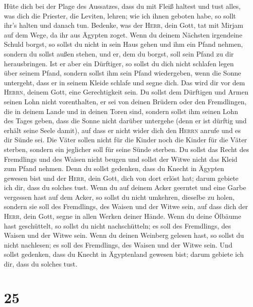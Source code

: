  Hüte dich bei der Plage des Aussatzes, dass du mit Fleiß
haltest und tust alles, was dich die Priester, die Leviten, lehren; wie
ich ihnen geboten habe, so sollt ihr's halten und danach tun.
 Bedenke, was der \textsc{Herr}, dein Gott, tat mit Mirjam
auf dem Wege, da ihr aus Ägypten zoget.  Wenn du deinem
Nächsten irgendeine Schuld borgst, so sollst du nicht in sein Haus gehen
und ihm ein Pfand nehmen,  sondern du sollst außen
stehen, und er, dem du borgst, soll sein Pfand zu dir herausbringen.
 Ist er aber ein Dürftiger, so sollst du dich nicht
schlafen legen über seinem Pfand,  sondern sollst ihm
sein Pfand wiedergeben, wenn die Sonne untergeht, dass er in seinem
Kleide schlafe und segne dich. Das wird dir vor dem \textsc{Herrn},
deinem Gott, eine Gerechtigkeit sein.  Du sollst dem
Dürftigen und Armen seinen Lohn nicht vorenthalten, er sei von deinen
Brüdern oder den Fremdlingen, die in deinem Lande und in deinen Toren
sind,  sondern sollst ihm seinen Lohn des Tages geben,
dass die Sonne nicht darüber untergehe (denn er ist dürftig und erhält
seine Seele damit), auf dass er nicht wider dich den \textsc{Herrn}
anrufe und es dir Sünde sei.  Die Väter sollen nicht für
die Kinder noch die Kinder für die Väter sterben, sondern ein jeglicher
soll für seine Sünde sterben.  Du sollst das Recht des
Fremdlings und des Waisen nicht beugen und sollst der Witwe nicht das
Kleid zum Pfand nehmen.  Denn du sollst gedenken, dass du
Knecht in Ägypten gewesen bist und der \textsc{Herr}, dein Gott, dich
von dort erlöst hat; darum gebiete ich dir, dass du solches tust.
 Wenn du auf deinem Acker geerntet und eine Garbe
vergessen hast auf dem Acker, so sollst du nicht umkehren, dieselbe zu
holen, sondern sie soll des Fremdlings, des Waisen und der Witwe sein,
auf dass dich der \textsc{Herr}, dein Gott, segne in allen Werken deiner
Hände.  Wenn du deine Ölbäume hast geschüttelt, so sollst
du nicht nachschütteln; es soll des Fremdlings, des Waisen und der Witwe
sein.  Wenn du deinen Weinberg gelesen hast, so sollst du
nicht nachlesen; es soll des Fremdlings, des Waisen und der Witwe sein.
 Und sollst gedenken, dass du Knecht in Ägyptenland
gewesen bist; darum gebiete ich dir, dass du solches tust.

\hypertarget{section-24}{%
\section{25}\label{section-24}}

